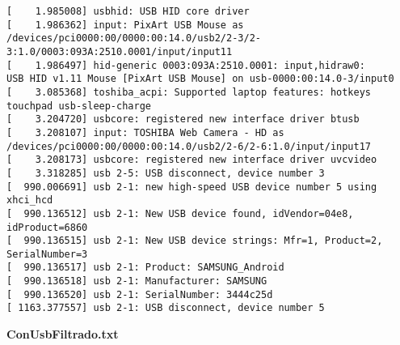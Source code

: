 \begin{verbatim}
[    1.985008] usbhid: USB HID core driver
[    1.986362] input: PixArt USB Mouse as 
/devices/pci0000:00/0000:00:14.0/usb2/2-3/2-3:1.0/0003:093A:2510.0001/input/input11
[    1.986497] hid-generic 0003:093A:2510.0001: input,hidraw0: 
USB HID v1.11 Mouse [PixArt USB Mouse] on usb-0000:00:14.0-3/input0
[    3.085368] toshiba_acpi: Supported laptop features: hotkeys touchpad usb-sleep-charge
[    3.204720] usbcore: registered new interface driver btusb
[    3.208107] input: TOSHIBA Web Camera - HD as 
/devices/pci0000:00/0000:00:14.0/usb2/2-6/2-6:1.0/input/input17
[    3.208173] usbcore: registered new interface driver uvcvideo
[    3.318285] usb 2-5: USB disconnect, device number 3
[  990.006691] usb 2-1: new high-speed USB device number 5 using xhci_hcd
[  990.136512] usb 2-1: New USB device found, idVendor=04e8, idProduct=6860
[  990.136515] usb 2-1: New USB device strings: Mfr=1, Product=2, SerialNumber=3
[  990.136517] usb 2-1: Product: SAMSUNG_Android
[  990.136518] usb 2-1: Manufacturer: SAMSUNG
[  990.136520] usb 2-1: SerialNumber: 3444c25d
[ 1163.377557] usb 2-1: USB disconnect, device number 5
\end{verbatim}

\textbf{ConUsbFiltrado.txt}

